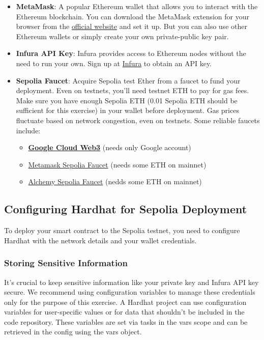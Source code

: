 \documentclass[12pt]{article}
\begin{document}
\begin{itemize}
    \item \textbf{MetaMask}: A popular Ethereum wallet that allows you to interact with the Ethereum blockchain. You can download the MetaMask extension for your browser from the \href{https://metamask.io/}{official website} and set it up. But you can also use other Ethereum wallets or simply create your own private-public key pair.

    \item \textbf{Infura API Key}: Infura provides access to Ethereum nodes without the need to run your own. Sign up at \href{https://infura.io/}{Infura} to obtain an API key.

    \item \textbf{Sepolia Faucet}: Acquire Sepolia test Ether from a faucet to fund your deployment. Even on testnets, you'll need testnet ETH to pay for gas fees. Make sure you have enough Sepolia ETH (0.01 Sepolia ETH should be sufficient for this exercise) in your wallet before deployment. Gas prices fluctuate based on network congestion, even on testnets. Some reliable faucets include:
          \begin{itemize}
              \item \href{https://cloud.google.com/application/web3/faucet/ethereum/sepolia}{\textbf{Google Cloud Web3}} (needs only Google account)
              \item \href{https://docs.metamask.io/developer-tools/faucet/}{Metamask Sepolia Faucet} (needs some ETH on mainnet)
              \item \href{https://www.alchemy.com/faucets/ethereum-sepolia}{Alchemy Sepolia Faucet}  (nedds some ETH on mainnet)
          \end{itemize}
\end{itemize}

\subsection{Configuring Hardhat for Sepolia Deployment}

To deploy your smart contract to the Sepolia testnet, you need to configure
Hardhat with the network details and your wallet credentials.

\subsubsection*{Storing Sensitive Information}

It's crucial to keep sensitive information like your private key and Infura API
key secure. We recommend using configuration variables to manage these
credentials only for the purpose of this exercise. A Hardhat project can use
configuration variables for user-specific values or for data that shouldn't be
included in the code repository. These variables are set via tasks in the vars
scope and can be retrieved in the config using the vars object.
\end{document}
